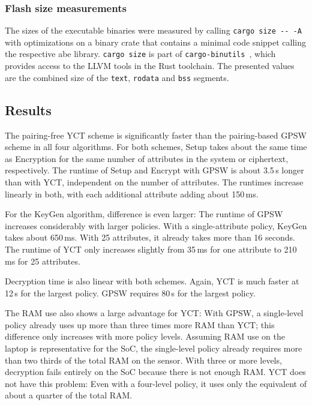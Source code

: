 \subsubsection{Flash size measurements}


The sizes of the executable binaries were measured by calling \verb+cargo size -- -A+ with optimizations on a binary crate that contains a minimal code snippet calling the respective \acrshort{abe} library.
\verb+cargo size+ is part of \verb+cargo-binutils+~\cite{noauthor_cargo-binutils_nodate}, which provides access to the LLVM tools in the Rust toolchain.
The presented values are the combined size of the \texttt{text}, \texttt{rodata} and \texttt{bss} segments.


\subsection{Results}
The pairing-free YCT scheme is significantly faster than the pairing-based GPSW scheme in all four algorithms. 
For both schemes, Setup takes about the same time as Encryption for the same number of attributes in the system or ciphertext, respectively.
The runtime of Setup and Encrypt with GPSW is about 3.5\,s longer than with YCT, independent on the number of attributes.
The runtimes increase linearly in both, with each additional attribute adding about 150\,ms.

For the KeyGen algorithm, difference is even larger:
The runtime of GPSW increases considerably with larger policies.
With a single-attribute policy, KeyGen takes about 650\,ms. With 25 attributes, it already takes more than 16 seconds.
The runtime of YCT only increases slightly from 35\,ms for one attribute to 210\,ms for 25 attributes.

Decryption time is also linear with both schemes.
Again, YCT is much faster at 12\,s for the largest policy. GPSW requires 80\,s for the largest policy.

The RAM use also shows a large advantage for YCT:
With GPSW, a single-level policy already uses up more than three times more RAM than YCT; this difference only increases with more policy levels.
Assuming RAM use on the laptop is representative for the SoC, the single-level policy already requires more than two thirds of the total RAM on the sensor.
With three or more levels, decryption fails entirely on the SoC because there is not enough RAM.
YCT does not have this problem: Even with a four-level policy, it uses only the equivalent of about a quarter of the total RAM.

